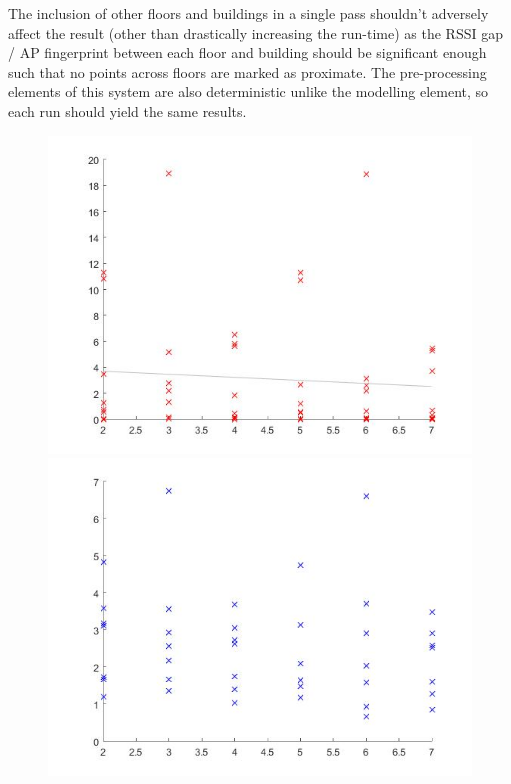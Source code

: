 \documentclass{UoYCSproject}
\begin{document}
                The inclusion of other floors and buildings in a single pass shouldn't adversely affect the result (other than drastically increasing the run-time) as the RSSI gap / AP fingerprint between each floor and building should be significant enough such that no points across floors are marked as proximate. The pre-processing elements of this system are also deterministic unlike the modelling element, so each run should yield the same results.
                
                \begin{figure}[h]
                	\label{fig:ez_overlap_prox}
                	\centering
                	\begin{minipage}{0.5\textwidth}
                		\centering
                		\includegraphics[width=1\textwidth]{ez_overlap_prox_correct.jpg}
                	\end{minipage}\hfill
                	\begin{minipage}{0.5\textwidth}
                		\centering
                		\includegraphics[width=1\textwidth]{ez_overlap_prox_false.jpg}

\end{minipage}
\end{figure}
\end{document}
